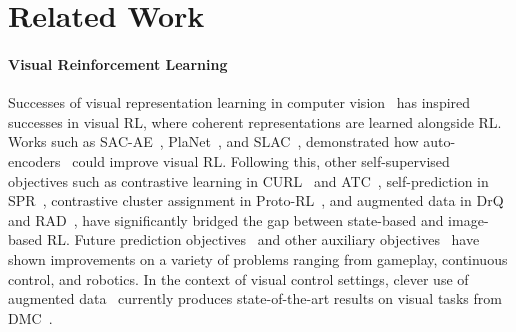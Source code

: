 \section{Related Work}

\paragraph{Visual Reinforcement Learning} Successes of visual representation learning in computer vision~\citep{vincent2008extracting, doersch2015unsupervised,Wang_UnsupICCV2015, noroozi2016unsupervised,zhang2017split,gidaris2018unsupervised} has inspired successes in visual RL, where coherent representations are learned alongside RL. Works such as SAC-AE~\citep{yarats2019improving}, PlaNet~\citep{hafner2018planet}, and SLAC~\citep{lee2019stochastic}, demonstrated how auto-encoders~\citep{finn2015deepspatialae} could improve visual RL. Following this, other self-supervised objectives such as contrastive learning in CURL~\citep{srinivas2020curl} and ATC~\citep{stooke2020decoupling}, self-prediction in SPR~\citep{schwarzer2020data}, contrastive cluster assignment in Proto-RL~\citep{yarats2021proto}, and augmented data in DrQ~\citep{yarats2021image} and RAD~\citep{laskin2020reinforcement}, have significantly bridged the gap between state-based and image-based RL. Future prediction objectives~\citep{hafner2018planet,hafner2019dream,yan2020learning,finn2015deepspatialae,pinto2016curious,agrawal2016learning} and other auxiliary objectives~\citep{jaderberg2016reinforcement,zhan2020framework,young2020visual,chen2020robust} have shown improvements on a variety of problems ranging from gameplay, continuous control, and robotics. In the context of visual control settings, clever use of augmented data~\citep{yarats2021image,laskin2020reinforcement} currently produces state-of-the-art results on visual tasks from DMC~\citep{tassa2018dmcontrol}. %

